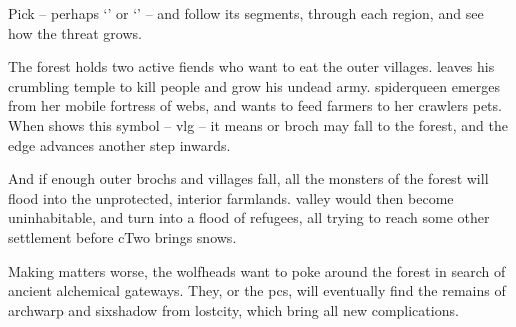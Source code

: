 \begin{multicols}{2}
Pick  -- perhaps `' or `' -- and follow its \glspl{segment}, through each \gls{region}, and see how the threat grows.


\renewcommand\csComments{
  \mapCircle{16}{76}{1.7}{Dyson_Logos/bandit_camp}
  \mapCircle{35}{88}{2}{Dyson_Logos/forgotten_city}
  \mapCircle{27}{09}{2}{Dyson_Logos/qualme_temple}
  \mapCircle[4]{56}{52}{2.5}{Dyson_Logos/town}
  \mapCircle{44}{41}{2}{Dyson_Logos/redfall}
  \mapCircle{83}{09}{1.7}{Dyson_Logos/shadow_gate}
  \mapCircle{86}{45}{1.7}{Dyson_Logos/lochside}
  \draw[very thick,white] (11,0.6) -- (12,0.6) node[anchor=north]{\outline{10 Miles}} -- (13,0.6) ;
}



\end{multicols}

\label{sqList}

\begin{multicols}{2}
\noindent
The forest holds two active \glspl{fiend} who want to eat the outer \glspl{village}.
 leaves his crumbling temple to kill people and grow his undead army.
\Gls{spiderqueen} emerges from her mobile fortress of webs, and wants to feed farmers to her \glspl{crawler} pets.
When  shows this symbol -- \gls{vlg} -- it means  or \gls{broch} may fall to the forest, and the \gls{edge} advances another step inwards.

And if enough outer \glspl{broch} and \glspl{village} fall, all the \glspl{monster} of the forest will flood into the unprotected, interior farmlands.
\Gls{valley} would then become uninhabitable, and turn into a flood of refugees, all trying to reach some other settlement before \gls{cTwo} brings \glspl{snow}.

Making matters worse, the \glspl{wolfhead} want to poke around the forest in search of ancient alchemical gateways.
They, or the \glspl{pc}, will eventually find the remains of \gls{archwarp} and \gls{sixshadow} from \gls{lostcity}, which bring all new complications.

\end{multicols}


